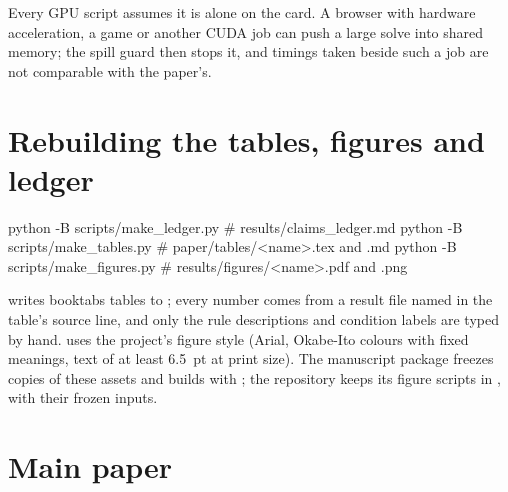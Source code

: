 \begin{warnbox}
Every GPU script assumes it is alone on the card. A browser with hardware acceleration, a game or another CUDA job
can push a large solve into shared memory; the spill guard then stops it, and timings taken beside such a job are not
comparable with the paper's.
\end{warnbox}

\section{Rebuilding the tables, figures and ledger}\label{sec:rebuild}
\begin{shell}
python -B scripts/make_ledger.py      # results/claims_ledger.md
python -B scripts/make_tables.py      # paper/tables/<name>.tex and .md
python -B scripts/make_figures.py     # results/figures/<name>.pdf and .png
\end{shell}

 writes booktabs tables to ; every number comes from a result file named in the
table's source line, and only the rule descriptions and condition labels are typed by hand.  uses
the project's figure style (Arial, Okabe-Ito colours with fixed meanings, text of at least 6.5~pt at print size). The
manuscript package freezes copies of these assets and builds with ; the repository keeps its figure
scripts in , with their frozen inputs.

\section{Main paper}\label{sec:mainmap}

